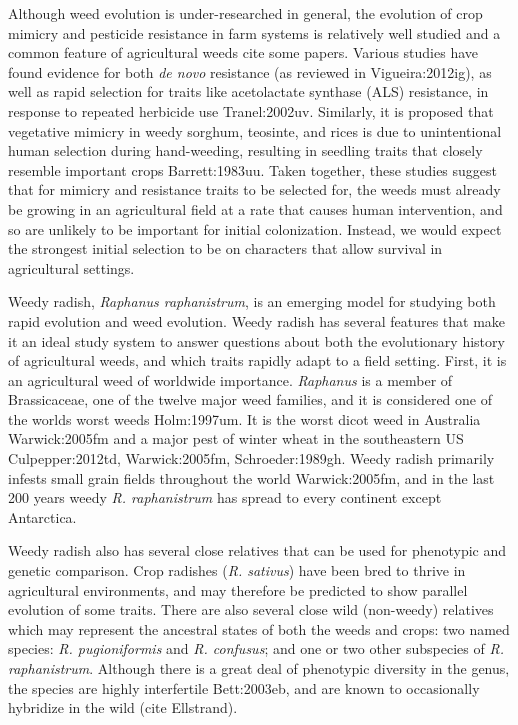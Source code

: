 \documentclass[twocolumn]{bmcart}%
\begin{document}
Although weed evolution is under-researched in general, the evolution of crop mimicry and pesticide resistance in farm systems is relatively well studied and a common feature of agricultural weeds {cite some papers}. Various studies have found evidence for both \textit{de novo} resistance (as reviewed in {Vigueira:2012ig}), as well as rapid selection for traits like acetolactate synthase (ALS) resistance, in response to repeated herbicide use {Tranel:2002uv}. Similarly, it is proposed that vegetative mimicry in weedy sorghum, teosinte, and rices is due to unintentional human selection during hand-weeding, resulting in seedling traits that closely resemble important crops {Barrett:1983uu}. Taken together, these studies suggest that for mimicry and resistance traits to be selected for, the weeds must already be growing in an agricultural field at a rate that causes human intervention, and so are unlikely to be important for initial colonization. Instead, we would expect the strongest initial selection to be on characters that allow survival in agricultural settings. 
%
%
%
    
Weedy radish, \textit{Raphanus raphanistrum}, is an emerging model for studying both rapid evolution and weed evolution. Weedy radish has several features that make it an ideal study system to answer questions about both the evolutionary history of agricultural weeds, and which traits rapidly adapt to a field setting. First, it is an agricultural weed of worldwide importance. \textit{Raphanus} is a member of Brassicaceae, one of the twelve major weed families, and it is considered one of the worlds worst weeds {Holm:1997um}. It is the worst dicot weed in Australia {Warwick:2005fm} and a major pest of winter wheat in the southeastern US {Culpepper:2012td, Warwick:2005fm, Schroeder:1989gh}. Weedy radish primarily infests small grain fields throughout the world {Warwick:2005fm}, and in the last 200 years weedy \textit{R. raphanistrum} has spread to every continent except Antarctica.

Weedy radish also has several close relatives that can be used for phenotypic and genetic comparison. Crop radishes (\textit{R. sativus}) have been bred to thrive in agricultural environments, and may therefore be predicted to show parallel evolution of some traits. There are also several close wild (non-weedy) relatives which may represent the ancestral states of both the weeds and crops: two named species: \textit{R. pugioniformis} and \textit{R. confusus}; and one or two other subspecies of \textit{R. raphanistrum}. Although there is a great deal of phenotypic diversity in the genus, the species are highly interfertile {Bett:2003eb}, and are known to occasionally hybridize in the wild (cite Ellstrand).
\end{document}
